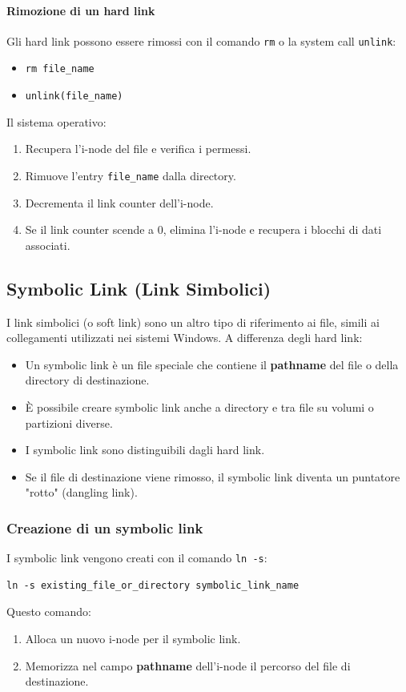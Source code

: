 \paragraph{Rimozione di un hard link}
Gli hard link possono essere rimossi con il comando \texttt{rm} o la system call \texttt{unlink}:
\begin{itemize}
    \item \texttt{rm file\_name}
    \item \texttt{unlink(file\_name)}
\end{itemize}
Il sistema operativo:
\begin{enumerate}
    \item Recupera l'i-node del file e verifica i permessi.
    \item Rimuove l'entry \texttt{file\_name} dalla directory.
    \item Decrementa il link counter dell'i-node.
    \item Se il link counter scende a 0, elimina l'i-node e recupera i blocchi di dati associati.
\end{enumerate}

\subsection{Symbolic Link (Link Simbolici)}
I link simbolici (o soft link) sono un altro tipo di riferimento ai file, simili ai collegamenti utilizzati nei sistemi Windows. A differenza degli hard link:
\begin{itemize}
    \item Un symbolic link è un file speciale che contiene il \textbf{pathname} del file o della directory di destinazione.
    \item È possibile creare symbolic link anche a directory e tra file su volumi o partizioni diverse.
    \item I symbolic link sono distinguibili dagli hard link.
    \item Se il file di destinazione viene rimosso, il symbolic link diventa un puntatore "rotto" (dangling link).
\end{itemize}

\subsubsection{Creazione di un symbolic link}
I symbolic link vengono creati con il comando \texttt{ln -s}:
\begin{verbatim}
ln -s existing_file_or_directory symbolic_link_name
\end{verbatim}
Questo comando:
\begin{enumerate}
    \item Alloca un nuovo i-node per il symbolic link.
    \item Memorizza nel campo \textbf{pathname} dell'i-node il percorso del file di destinazione.
\end{enumerate}

